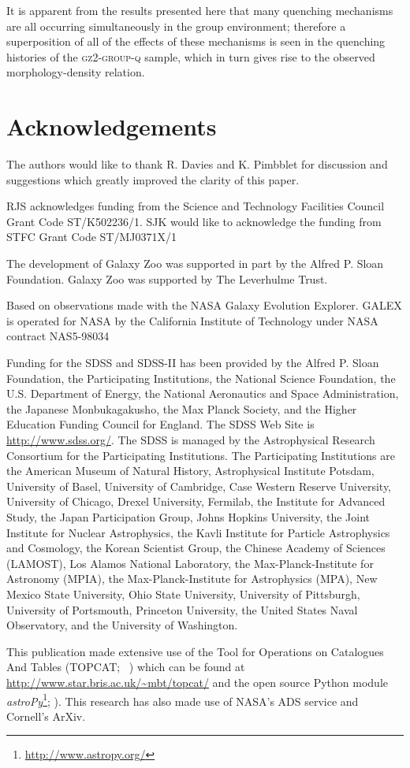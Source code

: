 \documentclass[useAMS,usenatbib]{mn2e}
\begin{document}
It is apparent from the results presented here that many quenching mechanisms are all occurring simultaneously in the group environment; therefore a superposition of all of the effects of these mechanisms is seen in the quenching histories of the \textsc{gz2-group-q} sample, which in turn gives rise to the observed morphology-density relation. 

\section*{Acknowledgements}
The authors would like to thank R. Davies and K. Pimbblet for discussion and suggestions which greatly improved the clarity of this paper. 

RJS acknowledges funding from the Science and Technology Facilities Council Grant Code ST/K502236/1. SJK would like to acknowledge the funding from STFC Grant Code ST/MJ0371X/1

The development of Galaxy Zoo was supported in part by the Alfred P. Sloan Foundation. Galaxy Zoo was supported by The Leverhulme Trust. 

Based on observations made with the NASA Galaxy Evolution Explorer.  GALEX is operated for NASA by the California Institute of Technology under NASA contract NAS5-98034

Funding for the SDSS and SDSS-II has been provided by the Alfred P. Sloan Foundation, the Participating Institutions, the National Science Foundation, the U.S. Department of Energy, the National Aeronautics and Space Administration, the Japanese Monbukagakusho, the Max Planck Society, and the Higher Education Funding Council for England. The SDSS Web Site is \url{http://www.sdss.org/}.
The SDSS is managed by the Astrophysical Research Consortium for the Participating Institutions. The Participating Institutions are the American Museum of Natural History, Astrophysical Institute Potsdam, University of Basel, University of Cambridge, Case Western Reserve University, University of Chicago, Drexel University, Fermilab, the Institute for Advanced Study, the Japan Participation Group, Johns Hopkins University, the Joint Institute for Nuclear Astrophysics, the Kavli Institute for Particle Astrophysics and Cosmology, the Korean Scientist Group, the Chinese Academy of Sciences (LAMOST), Los Alamos National Laboratory, the Max-Planck-Institute for Astronomy (MPIA), the Max-Planck-Institute for Astrophysics (MPA), New Mexico State University, Ohio State University, University of Pittsburgh, University of Portsmouth, Princeton University, the United States Naval Observatory, and the University of Washington.

This publication made extensive use of the Tool for Operations on Catalogues And Tables (TOPCAT; ~\citealt{taylor05}) which can be found at \url{http://www.star.bris.ac.uk/~mbt/topcat/} and the open source Python module \emph{astroPy}\footnote{\url{http://www.astropy.org/}}; \citealt{astropy13}). This research has also made use of NASA's ADS service and Cornell's ArXiv. 



  
\end{document}
